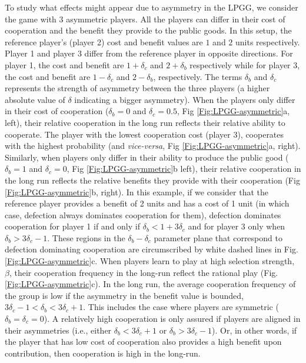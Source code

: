 \documentclass[11pt]{article}
\theoremstyle{plainCl1}
\theoremstyle{plainCl2}
\begin{document}
\noindent 
To study what effects might appear due to asymmetry in the LPGG, we consider the game with 3 asymmetric players. All the players can differ in their cost of cooperation and the benefit they provide to the public goods. In this setup, the reference player's (player 2) cost and benefit values are $1$ and $2$ units respectively. Player 1 and player 3 differ from the reference player in opposite directions. For player 1, the cost and benefit are $1 + \delta_c$ and $2 + \delta_b$ respectively while for player 3, the cost and benefit are $1 - \delta_c$ and $2 - \delta_b$, respectively. The terms $\delta_b$ and $\delta_c$ represents the strength of asymmetry between the three players (a higher absolute value of $\delta$ indicating a bigger asymmetry). When the players only differ in their cost of cooperation ($\delta_b = 0$ and $\delta_c = 0.5$, Fig \ref{Fig:LPGG-asymmetric}a, left), their relative cooperation in the long run reflects their relative ability to cooperate. The player with the lowest cooperation cost (player 3), cooperates with the highest probability (and \emph{vice-versa},  Fig \ref{Fig:LPGG-asymmetric}a, right). Similarly, when players only differ in their ability to produce the public good ($\delta_b = 1$ and $\delta_c = 0$, Fig \ref{Fig:LPGG-asymmetric}b left), their relative cooperation in the long run reflects the relative benefits they provide with their cooperation (Fig \ref{Fig:LPGG-asymmetric}b, right). In this example, if we consider that the reference player provides a benefit of 2 units and has a cost of 1 unit (in which case, defection always dominates cooperation for them), defection dominates cooperation for player 1 if and only if $\delta_b < 1 + 3\delta_c$ and for player 3 only when $\delta_b > 3\delta_c - 1$. These regions in the $\delta_b-\delta_c$ parameter plane that correspond to defection dominating cooperation are circumscribed by white dashed lines in Fig. \ref{Fig:LPGG-asymmetric}c. When players learn to play at high selection strength, $\beta$, their cooperation frequency in the long-run reflect the rational play (Fig. \ref{Fig:LPGG-asymmetric}c). In the long run, the average cooperation frequency of the group is low if the asymmetry in the benefit value is bounded, $3\delta_c - 1 < \delta_b < 3\delta_c + 1$. This includes the case where players are symmetric ($\delta_b = \delta_c = 0$). A relatively high cooperation is only assured if players are aligned in their asymmetries (i.e., either $\delta_b < 3\delta_c +1$ or $\delta_b > 3\delta_c - 1$). Or, in other words, if the player that has low cost of cooperation also provides a high benefit upon contribution, then cooperation is high in the long-run. 
\end{document}

